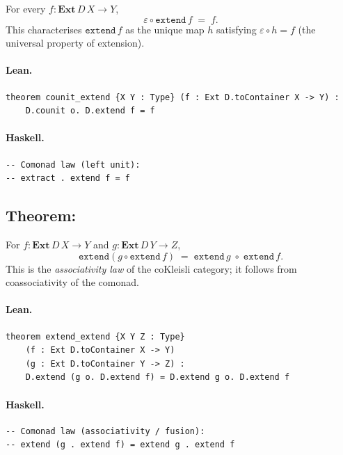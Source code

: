 \documentclass[11pt,a4paper]{article}
\begin{document}
\begin{thm}
For every $f : \mathbf{Ext}\,D\,X \to Y$,
\[
  \varepsilon \circ \mathtt{extend}\,f \;=\; f.
\]
This characterises $\mathtt{extend}\,f$ as the unique map $h$ satisfying
$\varepsilon \circ h = f$ (the universal property of extension).
\end{thm}

\paragraph{Lean.}
\begin{lstlisting}[style=lean]
theorem counit_extend {X Y : Type} (f : Ext D.toContainer X -> Y) :
    D.counit o. D.extend f = f
\end{lstlisting}

\paragraph{Haskell.}
\begin{lstlisting}[style=haskell]
-- Comonad law (left unit):
-- extract . extend f = f
\end{lstlisting}


\subsection{Theorem: }

\begin{thm}
For $f : \mathbf{Ext}\,D\,X \to Y$ and $g : \mathbf{Ext}\,D\,Y \to Z$,
\[
  \mathtt{extend}(g \circ \mathtt{extend}\,f)
  \;=\;
  \mathtt{extend}\,g \;\circ\; \mathtt{extend}\,f.
\]
This is the \emph{associativity law} of the coKleisli category; it follows
from coassociativity of the comonad.
\end{thm}

\paragraph{Lean.}
\begin{lstlisting}[style=lean]
theorem extend_extend {X Y Z : Type}
    (f : Ext D.toContainer X -> Y)
    (g : Ext D.toContainer Y -> Z) :
    D.extend (g o. D.extend f) = D.extend g o. D.extend f
\end{lstlisting}

\paragraph{Haskell.}
\begin{lstlisting}[style=haskell]
-- Comonad law (associativity / fusion):
-- extend (g . extend f) = extend g . extend f
\end{lstlisting}
\end{document}
